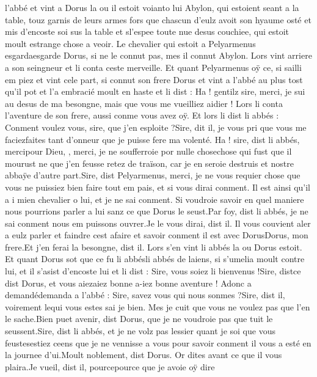 \documentclass{article}
\begin{document}
\begin{pages}
   l’abbé et vint a Dorus 
   la ou il estoit voianto lui Abylon, 
   qui estoient seant a la table, touz garnis de leurs armes fors que chascun d’eulz avoit son hyaume osté et mis d’encoste soi sus la 
   table et sl’espee toute nue desus couchiee, 
   qui estoit moult estrange chose a veoir. \pend
\pstart Le chevalier qui estoit a 
   Pelyarmenus esgardaesgarde 
   Dorus, si ne le connut pas, mes il connut Abylon. 
   Lors vint arriere a son seingneur et li conta ceste merveille. 
   Et quant Pelyarmenus oÿ ce, si sailli em piez et vint cele part, 
   si connut son frere Dorus et vint a l’abbé au plus tost 
   qu’il pot et l’a embracié moult en haste et li dist :
   Ha ! gentilz sire, merci, je sui au desus de ma besongne, mais que vous me vueilliez aidier !
   Lors li conta l’aventure de son frere, 
   aussi conme vous avez oÿ. Et lors li dist 
   li abbés :
   Conment voulez vous, sire, que j’en esploite ?Sire, dit il, je vous pri que vous me 
      faciezfaites tant d’onneur que je puisse fere ma volenté.
      Ha ! sire, dist li abbés, 
         mercipour Dieu, , 
         merci, je ne soufferroie por nulle chosechose qui fust que il mourust ne que 
      j’en feusse retez de traïson, car je en seroie destruis et nostre abbaÿe d’autre part.Sire, dist Pelyarmenus, merci, je ne vous requier chose que 
      vous ne puissiez bien faire tout em pais, et si vous dirai conment. Il est ainsi qu’il a i 
      mien chevalier o lui, et je ne sai 
      conment. Si voudroie savoir en quel maniere nous pourrions parler a lui sanz ce que Dorus le seust.Par foy, dist li abbés, je ne sai conment nous em puissons ouvrer.Je le vous dirai, dist il. Il vous couvient aler a eulz parler et faindre cest afaire et 
      savoir conment il est avec DorusDorus, mon frere.Et j’en ferai la besongne, dist il. 
   Lors s’en vint li abbés la ou Dorus estoit. 
   Et quant Dorus sot que ce fu 
   li abbésli abbés de laiens, si s’umelia moult contre lui, 
   et il s’asist d’encoste lui et li dist :
   Sire, vous soiez li bienvenus !Sire, distce dist 
      Dorus, et vous 
      aiezaiez bonne a-iez bonne aventure !
   Adonc a demandédemanda a l’abbé :
   Sire, savez vous qui nous sonmes ?Sire, dist il, voirement lequi vous estes 
      sai je bien. Mes je cuit que vous ne voulez pas que l’en le sache.Bien puet avenir, dist Dorus, que je ne voudroie pas que tuit le 
      seussent.Sire, dist li abbés, et je ne volz pas lessier quant je soi 
      que vous feustesestiez ceens que je ne vennisse a vous pour savoir 
      conment il vous a esté en la journee d’ui.Moult noblement, dist Dorus. Or dites avant ce que il vous plaira.Je vueil, dist il, pourcepource que je avoie oÿ dire 

\end{pages}
\end{document}

